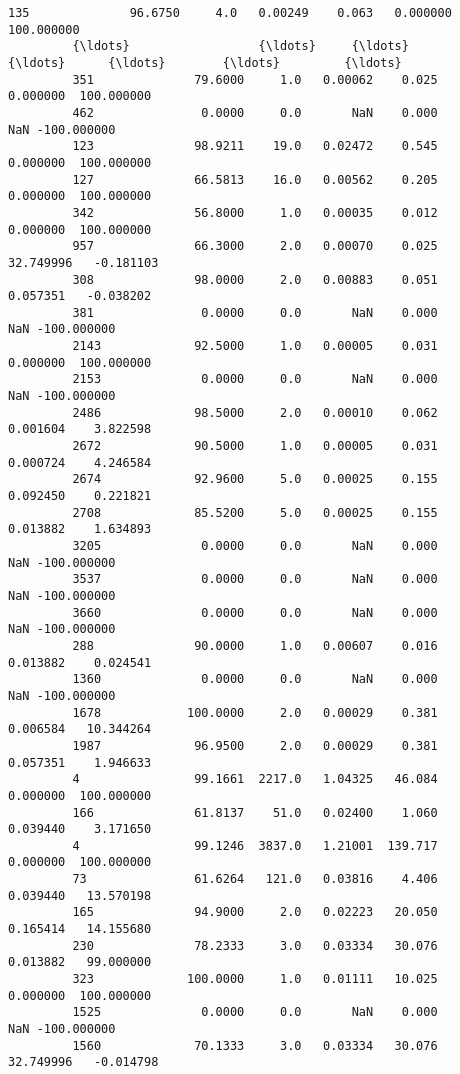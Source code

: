 \documentclass[11pt]{article}
\begin{document}
\begin{Verbatim}[commandchars=\\\{\}]
         135              96.6750     4.0   0.00249    0.063   0.000000  100.000000   
         {\ldots}                  {\ldots}     {\ldots}       {\ldots}      {\ldots}        {\ldots}         {\ldots}   
         351              79.6000     1.0   0.00062    0.025   0.000000  100.000000   
         462               0.0000     0.0       NaN    0.000        NaN -100.000000   
         123              98.9211    19.0   0.02472    0.545   0.000000  100.000000   
         127              66.5813    16.0   0.00562    0.205   0.000000  100.000000   
         342              56.8000     1.0   0.00035    0.012   0.000000  100.000000   
         957              66.3000     2.0   0.00070    0.025  32.749996   -0.181103   
         308              98.0000     2.0   0.00883    0.051   0.057351   -0.038202   
         381               0.0000     0.0       NaN    0.000        NaN -100.000000   
         2143             92.5000     1.0   0.00005    0.031   0.000000  100.000000   
         2153              0.0000     0.0       NaN    0.000        NaN -100.000000   
         2486             98.5000     2.0   0.00010    0.062   0.001604    3.822598   
         2672             90.5000     1.0   0.00005    0.031   0.000724    4.246584   
         2674             92.9600     5.0   0.00025    0.155   0.092450    0.221821   
         2708             85.5200     5.0   0.00025    0.155   0.013882    1.634893   
         3205              0.0000     0.0       NaN    0.000        NaN -100.000000   
         3537              0.0000     0.0       NaN    0.000        NaN -100.000000   
         3660              0.0000     0.0       NaN    0.000        NaN -100.000000   
         288              90.0000     1.0   0.00607    0.016   0.013882    0.024541   
         1360              0.0000     0.0       NaN    0.000        NaN -100.000000   
         1678            100.0000     2.0   0.00029    0.381   0.006584   10.344264   
         1987             96.9500     2.0   0.00029    0.381   0.057351    1.946633   
         4                99.1661  2217.0   1.04325   46.084   0.000000  100.000000   
         166              61.8137    51.0   0.02400    1.060   0.039440    3.171650   
         4                99.1246  3837.0   1.21001  139.717   0.000000  100.000000   
         73               61.6264   121.0   0.03816    4.406   0.039440   13.570198   
         165              94.9000     2.0   0.02223   20.050   0.165414   14.155680   
         230              78.2333     3.0   0.03334   30.076   0.013882   99.000000   
         323             100.0000     1.0   0.01111   10.025   0.000000  100.000000   
         1525              0.0000     0.0       NaN    0.000        NaN -100.000000   
         1560             70.1333     3.0   0.03334   30.076  32.749996   -0.014798   
         

\end{Verbatim}
\end{document}
